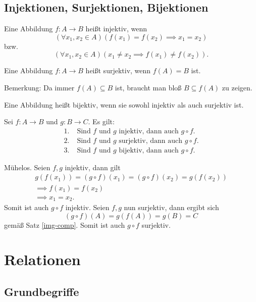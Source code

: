 \newpage
\subsection{Injektionen, Surjektionen, Bijektionen}

\begin{Definition}
Eine Abbildung $f\colon A\to B$ heißt injektiv, wenn
\[(\forall x_1,x_2\in A)(f(x_1)=f(x_2)\implies x_1=x_2)\]
bzw.
\[(\forall x_1,x_2\in A)(x_1\ne x_2\implies f(x_1)\ne f(x_2)).\]
\end{Definition}

\begin{Definition}
Eine Abbildung $f\colon A\to B$ heißt surjektiv,
wenn $f(A)=B$ ist.
\end{Definition}
Bemerkung: Da immer $f(A)\subseteq B$ ist, braucht man bloß $B\subseteq f(A)$
zu zeigen.

\begin{Definition}
Eine Abbildung heißt bijektiv, wenn sie sowohl injektiv als
auch surjektiv ist.
\end{Definition}

\begin{Satz}
Sei $f\colon A\to B$ und $g\colon B\to C$. Es gilt:
\begin{align*}
1.\; & \text{Sind $f$ und $g$ injektiv, dann auch $g\circ f$}.\\
2.\; & \text{Sind $f$ und $g$ surjektiv, dann auch $g\circ f$}.\\
3.\; & \text{Sind $f$ und $g$ bijektiv, dann auch $g\circ f$}.
\end{align*}
\end{Satz}
 Mühelos. Seien $f,g$ injektiv, dann gilt
\begin{gather*}
g(f(x_1)) = (g\circ f)(x_1) = (g\circ f)(x_2) = g(f(x_2))\\
\implies f(x_1) = f(x_2)\\
\implies x_1 = x_2.
\end{gather*}
Somit ist auch $g\circ f$ injektiv. Seien $f,g$ nun surjektiv,
dann ergibt sich
\[(g\circ f)(A) = g(f(A)) = g(B) = C\]
gemäß Satz \ref{img-comp}.
Somit ist auch $g\circ f$ surjektiv.\;\qedsymbol

\newpage
\section{Relationen}
\subsection{Grundbegriffe}

